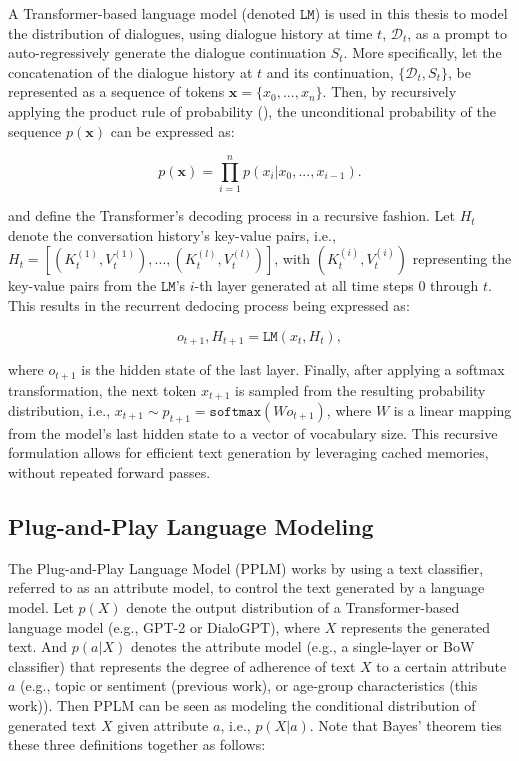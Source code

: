 A Transformer-based language model (denoted $\texttt{LM}$) is used in this thesis to model the distribution of dialogues, using dialogue history at time $t$, $\mathcal{D}_t$, as a prompt to auto-regressively generate the dialogue continuation $S_t$. More specifically, let the concatenation of the dialogue history at $t$ and its continuation, $\{\mathcal{D}_t, S_t\}$, be represented as a sequence of tokens $\textbf{x}= \{x_0, ..., x_n\}$. Then, by recursively applying the product rule of probability (\cite{bishop2006pattern}), the unconditional probability of the sequence $p(\textbf{x})$ can be expressed as:

\begin{equation}
    p(\textbf{x}) = \prod_{i = 1}^n p(x_i | x_0, ..., x_{i - 1}).
\end{equation}

\cite{dathathri2019plug} and \cite{madotto-etal-2020-plug} define the Transformer's decoding process in a recursive fashion. Let $H_t$ denote the conversation history's key-value pairs, i.e., $H_t = \left[ (K_t^{(1)}, V_t^{(1)}), ..., (K_t^{(l)}, V_t^{(l)}) \right]$, with $(K_t^{(i)}, V_t^{(i)})$ representing the key-value pairs from the $\texttt{LM}$'s $i$-th layer generated at all time steps $0$ through $t$. This results in the recurrent dedocing process being expressed as:

\begin{equation}
    o_{t + 1}, H_{t + 1} = \texttt{LM} \left( x_t, H_t \right),
\end{equation}

where $o_{t + 1}$ is the hidden state of the last layer. Finally, after applying a softmax transformation, the next token $x_{t + 1}$ is sampled from the resulting probability distribution, i.e.,  $x_{t + 1} \sim p_{t + 1} = \texttt{softmax} \left( W o_{t + 1} \right)$, where $W$ is a linear mapping from the model's last hidden state to a vector of vocabulary size. This recursive formulation allows for efficient text generation by leveraging cached memories, without repeated forward passes.

\subsection{Plug-and-Play Language Modeling}
\label{sec:ppm}

The Plug-and-Play Language Model (PPLM) \cite{dathathri2019plug} works by using a text classifier, referred to as an attribute model, to control the text generated by a language model. Let $p(X)$ denote the output distribution of a Transformer-based language model (e.g., GPT-2 or DialoGPT), where $X$ represents the generated text. And $p(a | X)$ denotes the attribute model (e.g., a single-layer or BoW classifier) that represents the degree of adherence of text $X$ to a certain attribute $a$ (e.g., topic or sentiment (previous work), or age-group characteristics (this work)). Then PPLM can be seen as modeling the conditional distribution of generated text $X$ given attribute $a$, i.e., $p(X | a)$. Note that Bayes' theorem ties these three definitions together as follows:

